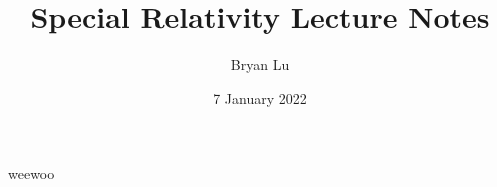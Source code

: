 \documentclass[12pt]{scrartcl}
\title{Special Relativity Lecture Notes}
\author{Bryan Lu}
\date{7 January 2022} %
\begin{document}
\maketitle

weewoo
\end{document}
